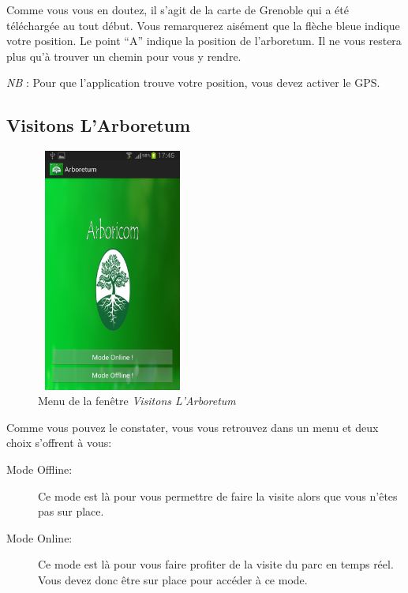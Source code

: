 \documentclass[a4paper,11pt]{article}
\begin{document}
    Comme vous vous en doutez, il s'agit de la carte de Grenoble qui a été téléchargée au tout début.
    Vous remarquerez aisément que la flèche bleue indique votre position. Le point ``A'' indique la position de l'arboretum.
    Il ne vous restera plus qu'à trouver un chemin pour vous y rendre.
    
   \textit{NB} : Pour que l'application trouve votre position, vous devez activer le GPS.
   
   \subsection{Visitons L'Arboretum}
    \begin{figure}[H]
     \begin{center}
      \includegraphics[width=5cm,height=8cm]{visitonsMenu.png}
    \caption{Menu de la fenêtre \textit{Visitons L'Arboretum}}
     \end{center}
    \end{figure}
    \newpage
    Comme vous pouvez le constater, vous vous retrouvez dans un menu et deux choix s'offrent à vous:
    \begin{description}
    \item [Mode Offline:] Ce mode est là pour vous permettre de faire la visite alors que vous n'êtes pas sur place.
     \item [Mode Online:] Ce mode est là pour vous faire profiter de la visite du parc en temps réel. Vous devez donc être sur place pour accéder 
     à ce mode.
    \end{description}
   
\end{document}
